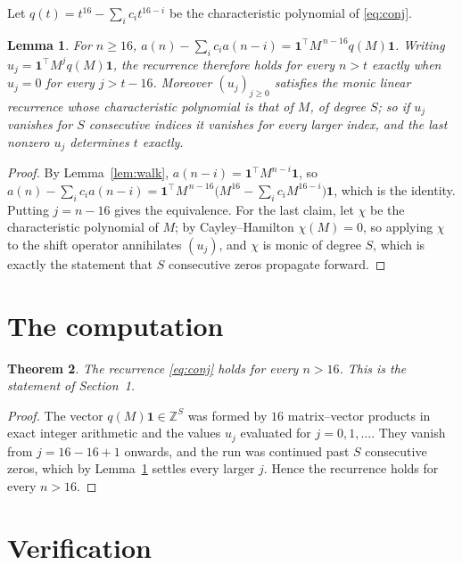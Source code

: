\documentclass[11pt,a4paper]{article}
\theoremstyle{plain}
\newtheorem{theorem}{Theorem}
\newtheorem{lemma}[theorem]{Lemma}
\theoremstyle{definition}
\begin{document}
Let $q(t)=t^{16}-\sum_i c_i t^{16-i}$ be the characteristic polynomial of
\eqref{eq:conj}.

\begin{lemma}\label{lem:crit}
For $n\ge16$,
$a(n)-\sum_i c_i a(n-i)=\mathbf{1}^{\!\top}M^{\,n-16}q(M)\mathbf{1}$. Writing
$u_j=\mathbf{1}^{\!\top}M^{j}q(M)\mathbf{1}$, the recurrence therefore holds for every
$n>t$ exactly when $u_j=0$ for every $j>t-16$. Moreover $(u_j)_{j\ge0}$ satisfies the
monic linear recurrence whose characteristic polynomial is that of $M$, of degree $S$; so
if $u_j$ vanishes for $S$ consecutive indices it vanishes for every larger index, and the
last nonzero $u_j$ determines $t$ exactly.
\end{lemma}

\begin{proof}
By Lemma~\ref{lem:walk}, $a(n-i)=\mathbf{1}^{\!\top}M^{n-i}\mathbf{1}$, so
$a(n)-\sum_i c_i a(n-i)
=\mathbf{1}^{\!\top}M^{\,n-16}\bigl(M^{16}-\sum_i c_i M^{16-i}\bigr)
\mathbf{1}$, which is the identity. Putting $j=n-16$ gives the equivalence. For the
last claim, let $\chi$ be the characteristic polynomial of $M$; by Cayley--Hamilton
$\chi(M)=0$, so applying $\chi$ to the shift operator annihilates $(u_j)$, and $\chi$ is
monic of degree $S$, which is exactly the statement that $S$ consecutive zeros propagate
forward.
\end{proof}

\section{The computation}

\begin{theorem}
The recurrence \eqref{eq:conj} holds for every $n>16$. This is the statement of
Section~1.
\end{theorem}

\begin{proof}
The vector $q(M)\mathbf{1}\in\mathbb{Z}^{S}$ was formed by $16$ matrix--vector
products in exact integer arithmetic and the values $u_j$ evaluated for
$j=0,1,\dots$. They vanish from $j=16-16+1$ onwards, and the run was continued past
$S$ consecutive zeros, which by Lemma~\ref{lem:crit} settles every larger $j$. Hence the
recurrence holds for every $n>16$.
\end{proof}

\section{Verification}
\end{document}
